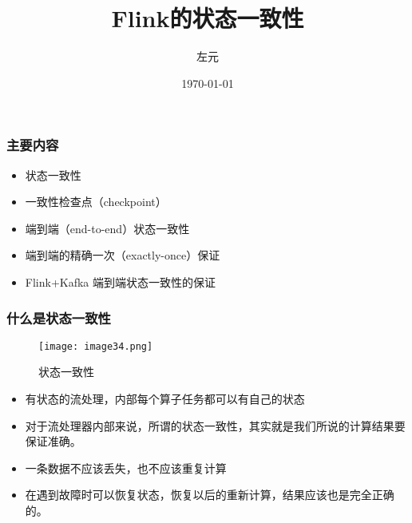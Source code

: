 \documentclass{beamer}
\title{Flink的状态一致性}
\date{\today}
\author{左元}
\institute{尚硅谷 大数据组}
\begin{document}
  \maketitle
  \begin{frame}
    \frametitle{主要内容}

    \begin{itemize}
        \item 状态一致性
        \item 一致性检查点（checkpoint）
        \item 端到端（end-to-end）状态一致性
        \item 端到端的精确一次（exactly-once）保证
        \item Flink+Kafka 端到端状态一致性的保证
    \end{itemize}
  
  \end{frame}

  \begin{frame}
      \frametitle{什么是状态一致性}
      
      \begin{figure}
      	\centering
      	\texttt{[image: image34.png]}
      	\caption{状态一致性}
      \end{figure}
  
      \begin{itemize}
          \item 有状态的流处理，内部每个算子任务都可以有自己的状态
          \item 对于流处理器内部来说，所谓的状态一致性，其实就是我们所说的计算结果要保证准确。
          \item 一条数据不应该丢失，也不应该重复计算
          \item 在遇到故障时可以恢复状态，恢复以后的重新计算，结果应该也是完全正确的。
      \end{itemize}
  
  \end{frame}
\end{document}
